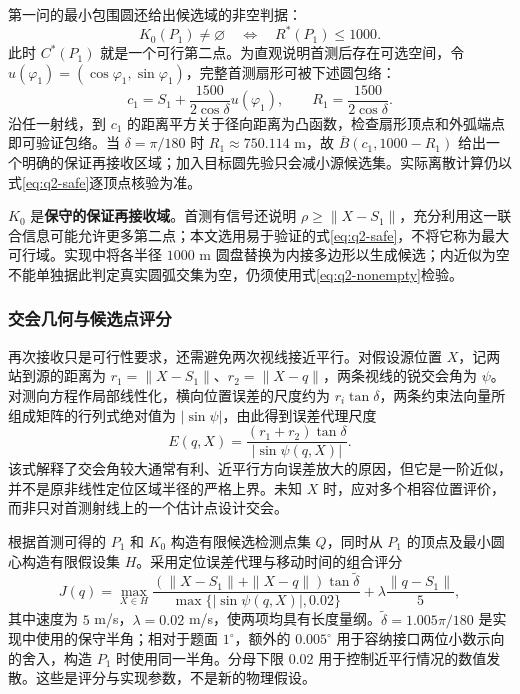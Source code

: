第一问的最小包围圆还给出候选域的非空判据：
\begin{equation}\label{eq:q2-nonempty}
K_0(P_1)\ne\varnothing\quad\Longleftrightarrow\quad R^*(P_1)\le1000.
\end{equation}
此时 $C^*(P_1)$ 就是一个可行第二点。为直观说明首测后存在可选空间，令 $u(\varphi_1)=(\cos\varphi_1,\sin\varphi_1)$，完整首测扇形可被下述圆包络：
\[
c_1=S_1+\frac{1500}{2\cos\delta}u(\varphi_1),\qquad R_1=\frac{1500}{2\cos\delta}.
\]
沿任一射线，到 $c_1$ 的距离平方关于径向距离为凸函数，检查扇形顶点和外弧端点即可验证包络。当 $\delta=\pi/180$ 时 $R_1\approx750.114$ m，故 $\overline B(c_1,1000-R_1)$ 给出一个明确的保证再接收区域；加入目标圆先验只会减小源候选集。实际离散计算仍以式\eqref{eq:q2-safe}逐顶点核验为准。

$K_0$ 是\textbf{保守的保证再接收域}。首测有信号还说明 $\rho\ge\|X-S_1\|$，充分利用这一联合信息可能允许更多第二点；本文选用易于验证的式\eqref{eq:q2-safe}，不将它称为最大可行域。实现中将各半径 $1000$ m 圆盘替换为内接多边形以生成候选；内近似为空不能单独据此判定真实圆弧交集为空，仍须使用式\eqref{eq:q2-nonempty}检验。

\subsubsection{交会几何与候选点评分}

再次接收只是可行性要求，还需避免两次视线接近平行。对假设源位置 $X$，记两站到源的距离为 $r_1=\|X-S_1\|$、$r_2=\|X-q\|$，两条视线的锐交会角为 $\psi$。对测向方程作局部线性化，横向位置误差的尺度约为 $r_i\tan\delta$，两条约束法向量所组成矩阵的行列式绝对值为 $|\sin\psi|$，由此得到误差代理尺度
\begin{equation}\label{eq:q2-error}
E(q,X)=\frac{(r_1+r_2)\tan\delta}{|\sin\psi(q,X)|}.
\end{equation}
该式解释了交会角较大通常有利、近平行方向误差放大的原因，但它是一阶近似，并不是原非线性定位区域半径的严格上界。未知 $X$ 时，应对多个相容位置评价，而非只对首测射线上的一个估计点设计交会。

根据首测可得的 $P_1$ 和 $K_0$ 构造有限候选检测点集 $Q$，同时从 $P_1$ 的顶点及最小圆心构造有限假设集 $H$。采用定位误差代理与移动时间的组合评分
\begin{equation}\label{eq:q2-score}
J(q)=\max_{X\in H}\frac{(\|X-S_1\|+\|X-q\|)\tan\widetilde\delta}
{\max\{|\sin\psi(q,X)|,0.02\}}+\lambda\frac{\|q-S_1\|}{5},
\end{equation}
其中速度为 $5$ m/s，$\lambda=0.02$ m/s，使两项均具有长度量纲。$\widetilde\delta=1.005\pi/180$ 是实现中使用的保守半角；相对于题面 $1^\circ$，额外的 $0.005^\circ$ 用于容纳接口两位小数示向的舍入，构造 $P_1$ 时使用同一半角。分母下限 $0.02$ 用于控制近平行情况的数值发散。这些是评分与实现参数，不是新的物理假设。

